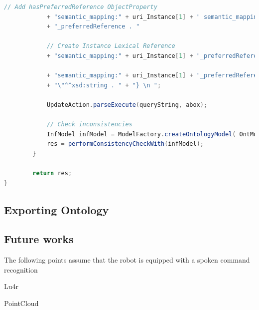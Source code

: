\begin{lstlisting}[language=Java]
			// Add hasPreferredReference ObjectProperty
			+ "semantic_mapping:" + uri_Instance[1] + " semantic_mapping_domain_model:hasPreferredReference semantic_mapping:" + uri_Instance[1]
			+ "_preferredReference . " 

			// Create Instance Lexical Reference
			+ "semantic_mapping:" + uri_Instance[1] + "_preferredReference rdf:type semantic_mapping_domain_model:PreferredReference . "

			+ "semantic_mapping:" + uri_Instance[1] + "_preferredReference semantic_mapping_domain_model:lexicalReference \"" + lexicalReference
			+ "\"^^xsd:string . " + "} \n ";
			
			UpdateAction.parseExecute(queryString, abox);
			
			// Check inconsistencies
		    InfModel infModel = ModelFactory.createOntologyModel( OntModelSpec.OWL_MEM_MICRO_RULE_INF, abox);
			res = performConsistencyCheckWith(infModel);
		}
	
		return res;
}
\end{lstlisting}

\subsection{Exporting Ontology}


\subsection{Future works}

The following points assume that the robot is equipped with a spoken command recognition

Lu4r

PointCloud